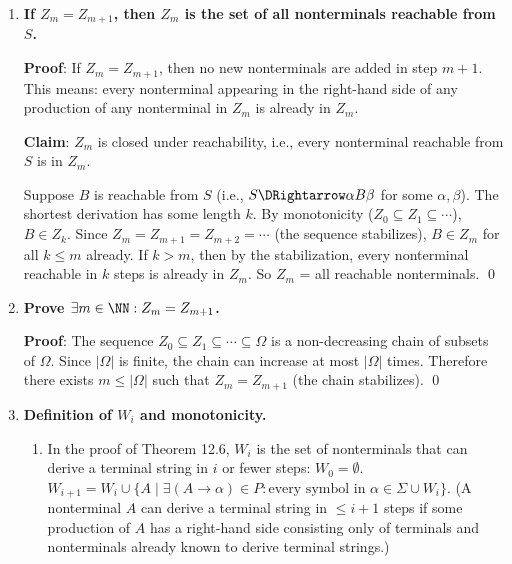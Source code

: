 \begin{enumerate}[{12.}1. ]
\textbf{Proof}: $Z_0\subseteq Z_1$ since $Z_1 = Z_0\cup(\cdots) \supseteq Z_0$. By induction: if $Z_k\subseteq Z_{k+1}$, then $Z_{k+1}\subseteq Z_{k+2}$ since any nonterminal in $Z_{k+1}$ is reachable in at most $k+1$ steps, hence is reachable in at most $k+2$ steps. The chain is bounded above by $\Omega$ (which is finite). \qed

\item \textbf{If $Z_m = Z_{m+1}$, then $Z_m$ is the set of all nonterminals reachable from $S$.}

\textbf{Proof}: If $Z_m = Z_{m+1}$, then no new nonterminals are added in step $m+1$. This means: every nonterminal appearing in the right-hand side of any production of any nonterminal in $Z_m$ is already in $Z_m$.

\textbf{Claim}: $Z_m$ is closed under reachability, i.e., every nonterminal reachable from $S$ is in $Z_m$.

Suppose $B$ is reachable from $S$ (i.e., $S\DRightarrow \alpha B\beta$ for some $\alpha,\beta$). The shortest derivation has some length $k$. By monotonicity ($Z_0\subseteq Z_1\subseteq\cdots$), $B\in Z_k$. Since $Z_m=Z_{m+1}=Z_{m+2}=\cdots$ (the sequence stabilizes), $B\in Z_m$ for all $k\leq m$ already. If $k>m$, then by the stabilization, every nonterminal reachable in $k$ steps is already in $Z_m$. So $Z_m$ = all reachable nonterminals. \qed

\item \textbf{Prove $\exists m\in\NN: Z_m = Z_{m+1}$.}

\textbf{Proof}: The sequence $Z_0\subseteq Z_1\subseteq\cdots\subseteq\Omega$ is a non-decreasing chain of subsets of $\Omega$. Since $|\Omega|$ is finite, the chain can increase at most $|\Omega|$ times. Therefore there exists $m\leq|\Omega|$ such that $Z_m=Z_{m+1}$ (the chain stabilizes). \qed

\item \textbf{Definition of $W_i$ and monotonicity.}

\begin{enumerate}
\item In the proof of Theorem 12.6, $W_i$ is the set of nonterminals that can derive a terminal string in $i$ or fewer steps:
$W_0 = \emptyset$.
$W_{i+1} = W_i \cup \{A \mid \exists (A\to\alpha)\in P: \text{every symbol in }\alpha\in\Sigma\cup W_i\}$.
(A nonterminal $A$ can derive a terminal string in $\leq i+1$ steps if some production of $A$ has a right-hand side consisting only of terminals and nonterminals already known to derive terminal strings.)


\end{enumerate}
\end{enumerate}
